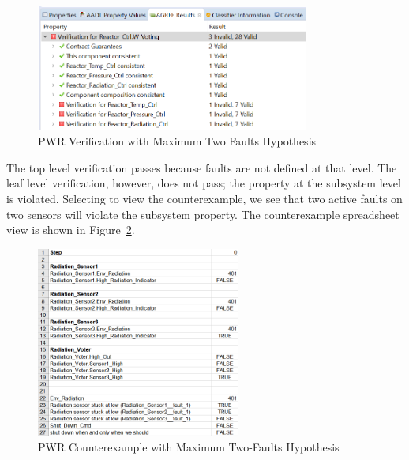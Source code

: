 \begin{figure}[h!]
		\includegraphics[width=0.8\textwidth]{images/maxNPWRVerif.png}
	\caption{PWR Verification with Maximum Two Faults Hypothesis}
	\label{fig:maxNPWRVerif}
\end{figure}

The top level verification passes because faults are not defined at that level. The leaf level verification, however, does not pass; the property at the subsystem level is violated. Selecting to view the counterexample, we see that two active faults on two sensors will violate the subsystem property. The counterexample spreadsheet view is shown in Figure~\ref{fig:maxNPWRVerifCoex}. 

\begin{figure}[h!]
		\includegraphics[width=0.6\textwidth]{images/maxNPWRVerifCoex.png}
	\caption{PWR Counterexample with Maximum Two-Faults Hypothesis}
	\label{fig:maxNPWRVerifCoex}
\end{figure}

